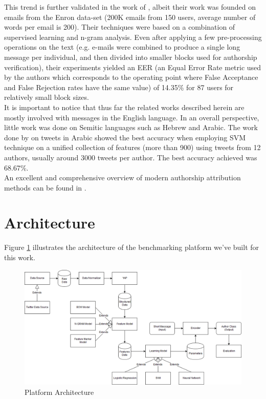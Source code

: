\documentclass[a4paper]{article}
\begin{document}
This trend is further validated in the work of \citep{brocardo}, albeit their work was founded on emails from the Enron data-set (200K emails from 150 users, average number of words per email is 200). Their techniques were based on a combination of supervised learning and n-gram analysis. Even after applying a few pre-processing operations on the text (e.g. e-mails were combined to produce a single long message per individual, and then divided into smaller blocks used for authorship verification), their experiments yielded an EER (an Equal Error Rate metric used by the authors which corresponds to the operating point where False Acceptance and False Rejection rates have the same value) of 14.35\% for 87 users for relatively small block sizes.\\
It is important to notice that thus far the related works described herein are mostly involved with messages in the English language. In an overall perspective, little work was done on Semitic languages such as Hebrew and Arabic. The work done by \citep{rabab} on tweets in Arabic showed the best accuracy when employing SVM technique on a unified collection of features (more than 900) using tweets from 12 authors, usually around 3000 tweets per author. The best accuracy achieved was 68.67\%.\\
An excellent and comprehensive overview of modern authorship attribution methods can be found in \citep{stamatatos}.

\section{Architecture}
\label{Architecture}

Figure \ref{fig:architecture} illustrates the architecture of the benchmarking platform we've built for this work.
\begin{figure}[hb]
	\centering
	\includegraphics[width=.5\textwidth]{"architecture/NLP Author Classification Architecture"}
	\caption{Platform Architecture}
		\label{fig:architecture}
\end{figure}
\end{document}
